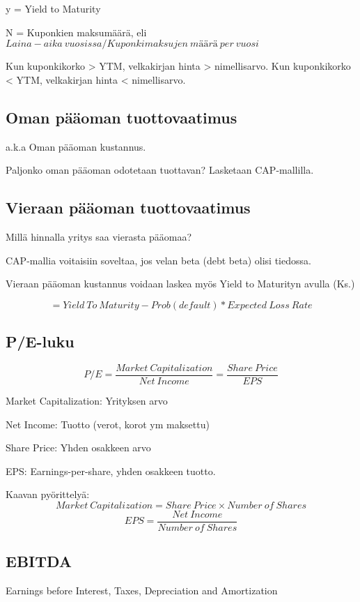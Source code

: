 \documentclass[a4paper]{article}
\begin{document}
y = Yield to Maturity

N = Kuponkien maksumäärä, eli $Laina-aika\ vuosissa / Kuponkimaksujen\ määrä\ per\ vuosi$

Kun kuponkikorko > YTM, velkakirjan hinta > nimellisarvo. Kun kuponkikorko < YTM, velkakirjan hinta < nimellisarvo.

\subsection{Oman pääoman tuottovaatimus}

a.k.a Oman pääoman kustannus.

Paljonko oman pääoman odotetaan tuottavan? Lasketaan CAP-mallilla.

\subsection{Vieraan pääoman tuottovaatimus}

Millä hinnalla yritys saa vierasta pääomaa?

CAP-mallia voitaisiin soveltaa, jos velan beta (debt beta) olisi tiedossa.

Vieraan pääoman kustannus voidaan laskea myös Yield to Maturityn avulla (Ks.)

\[
    = Yield\ To\ Maturity - Prob(default) * Expected\ Loss\ Rate
\]

\subsection{P/E-luku}

\[
    P/E = \frac{Market\ Capitalization}{Net\ Income} = \frac{Share\ Price}{EPS}
\]

Market Capitalization: Yrityksen arvo

Net Income: Tuotto (verot, korot ym maksettu)

Share Price: Yhden osakkeen arvo

EPS: Earnings-per-share, yhden osakkeen tuotto.

Kaavan pyörittelyä: 
\[
    Market\ Capitalization = Share\ Price \times Number\ of\ Shares
\]
\[
    EPS = \frac{Net\ Income}{Number\ of\ Shares} 
\]

\subsection{EBITDA}

Earnings before Interest, Taxes, Depreciation and Amortization
\end{document}
